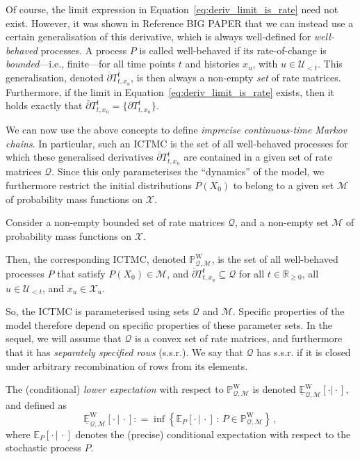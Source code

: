 \documentclass[twoside,11pt]{article}
\newcommand{\reals}{\mathbb{R}}
\newcommand{\realsnonneg}{\reals_{\geq 0}}
\newcommand{\states}{\mathcal{X}}
\newcommand{\processes}{\mathbb{P}}
\newcommand{\wprocesses}{\processes^{\mathrm{W}}}
\newcommand{\lexp}{\underline{\mathbb{E}}_{\rateset,\mathcal{M}}^\mathrm{W}}
\newcommand{\rateset}{\mathcal{Q}}
\newcommand{\coloneqq}{:\!=}
\begin{document}
Of course, the limit expression in Equation~\eqref{eq:deriv_limit_is_rate} need not exist. However, it was shown in Reference BIG PAPER that we can instead use a certain generalisation of this derivative, which is always well-defined for \emph{well-behaved} processes. A process $P$ is called well-behaved if its rate-of-change is \emph{bounded}---i.e., finite---for all time points $t$ and histories $x_u$, with $u\in\mathcal{U}_{<t}$. This generalisation, denoted $\overline{\partial} T_{t,x_u}^t$, is then always a non-empty \emph{set} of rate matrices. Furthermore, if the limit in Equation~\eqref{eq:deriv_limit_is_rate} exists, then it holds exactly that $\overline{\partial} T_{t,x_u}^t=\{\partial T_{t,x_u}^t\}$.

We can now use the above concepts to define \emph{imprecise continuous-time Markov chains}. In particular, such an ICTMC is the set of all well-behaved processes for which these generalised derivatives $\overline{\partial} T_{t,x_u}^t$ are contained in a given set of rate matrices $\rateset$. Since this only parameterises the ``dynamics'' of the model, we furthermore restrict the initial distributions $P(X_0)$ to belong to a given set $\mathcal{M}$ of probability mass functions on $\states$.

\begin{definition}[ICTMC]
Consider a non-empty bounded set of rate matrices $\rateset$, and a non-empty set $\mathcal{M}$ of probability mass functions on $\states$.

Then, the corresponding ICTMC, denoted $\wprocesses_{\rateset,\mathcal{M}}$, is the set of all well-behaved processes $P$ that satisfy $P(X_0)\in\mathcal{M}$, and $\overline{\partial} T_{t,x_u}^t \subseteq \rateset$ for all $t\in\realsnonneg$, all $u\in\mathcal{U}_{<t}$, and $x_u\in\states_u$.
\end{definition}
So, the ICTMC is parameterised using sets $\rateset$ and $\mathcal{M}$. Specific properties of the model therefore depend on specific properties of these parameter sets. In the sequel, we will assume that $\rateset$ is a convex set of rate matrices, and furthermore that it has \emph{separately specified rows} (s.s.r.). We say that $\rateset$ has s.s.r. if it is closed under arbitrary recombination of rows from its elements.

The (conditional) \emph{lower expectation} with respect to $\wprocesses_{\rateset,\mathcal{M}}$ is denoted $\lexp[\cdot\vert\cdot]$, and defined as
\begin{equation*}
\lexp[\cdot\,\vert\,\cdot] \coloneqq \inf\left\{\mathbb{E}_P[\cdot\,\vert\,\cdot]\,:\,P\in\wprocesses_{\rateset,\mathcal{M}}\right\}\,,
\end{equation*}
where $\mathbb{E}_P[\cdot\,\vert\,\cdot]$ denotes the (precise) conditional expectation with respect to the stochastic process $P$.
\end{document}
